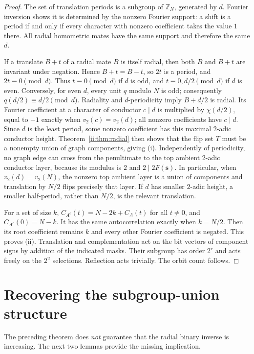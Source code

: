 \documentclass[11pt]{article}
\numberwithin{equation}{section}
\theoremstyle{definition}
\theoremstyle{remark}
\newcommand{\s}{\boldsymbol{s}}
\begin{document}
\begin{proof}
The set of translation periods is a subgroup of $\mathbb Z_N$, generated by $d$.  Fourier inversion shows it is determined by the nonzero Fourier support: a shift is a period if and only if every character with nonzero coefficient takes the value $1$ there.  All radial homometric mates have the same support and therefore the same $d$.

If a translate $B+t$ of a radial mate $B$ is itself radial, then both $B$ and $B+t$ are invariant under negation.  Hence $B+t=B-t$, so $2t$ is a period, and $2t\equiv0\pmod d$.  Thus $t\equiv0\pmod d$ if $d$ is odd, and $t\equiv0,d/2\pmod d$ if $d$ is even.  Conversely, for even $d$, every unit $q$ modulo $N$ is odd; consequently $q(d/2)\equiv d/2\pmod d$.  Radiality and $d$-periodicity imply $B+d/2$ is radial.  Its Fourier coefficient at a character of conductor $c\mid d$ is multiplied by $\chi(d/2)$, equal to $-1$ exactly when $v_2(c)=v_2(d)$; all nonzero coefficients have $c\mid d$.  Since $d$ is the least period, some nonzero coefficient has this maximal $2$-adic conductor height.  Theorem~\ref{ii:thm:radial} then shows that the flip set $T$ must be a nonempty union of graph components, giving (i).  Independently of periodicity, no graph edge can cross from the penultimate to the top ambient $2$-adic conductor layer, because its modulus is $2$ and $2\mid2F(\s)$.  In particular, when $v_2(d)=v_2(N)$, the nonzero top ambient layer is a union of components and translation by $N/2$ flips precisely that layer.  If $d$ has smaller $2$-adic height, a smaller half-period, rather than $N/2$, is the relevant translation.

For a set of size $k$, $C_{A^c}(t)=N-2k+C_A(t)$ for all $t\ne0$, and $C_{A^c}(0)=N-k$.  It has the same autocorrelation exactly when $k=N/2$.  Then its root coefficient remains $k$ and every other Fourier coefficient is negated.  This proves (ii).  Translation and complementation act on the bit vectors of component signs by addition of the indicated masks.  Their subgroup has order $2^r$ and acts freely on the $2^u$ selections.  Reflection acts trivially.  The orbit count follows.
\end{proof}

\section{Recovering the subgroup-union structure}
The preceding theorem does \emph{not} guarantee that the radial binary inverse is increasing.  The next two lemmas provide the missing implication.
\end{document}
